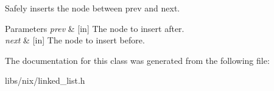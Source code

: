Safely inserts the node between prev and next. 


\begin{DoxyParams}{Parameters}
{\em prev} & \mbox{[}in\mbox{]} The node to insert after. \\
\hline
{\em next} & \mbox{[}in\mbox{]} The node to insert before. \\
\hline
\end{DoxyParams}


The documentation for this class was generated from the following file\+:\begin{DoxyCompactItemize}
\item 
libs/nix/linked\+\_\+list.\+h\end{DoxyCompactItemize}
